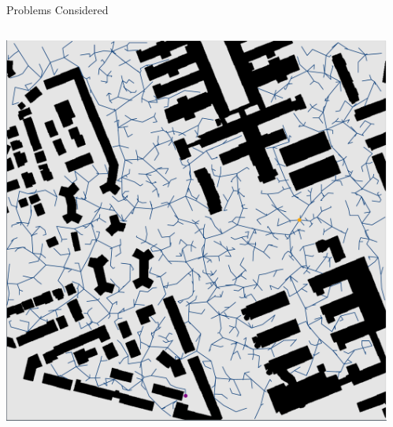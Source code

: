 \documentclass[aspectratio=169]{beamer}
\makeatletter
\newcommand{\white}[1]{{\color{pureminimalistic@text@white} #1}}
\makeatother
\begin{document}
\begin{frame}[plain]{\white{Problems Considered}}
  \begin{columns}[T]
      \begin{column}{.5\linewidth}
          \vspace{0.5cm}
          \includegraphics[width=1.0\linewidth, keepaspectratio]{figures/one_off.pdf}
          \vfill
      \end{column}
      \hspace{1.0em}
      \begin{column}{.5\linewidth}

\end{column}
\end{columns}
\end{frame}
\end{document}
